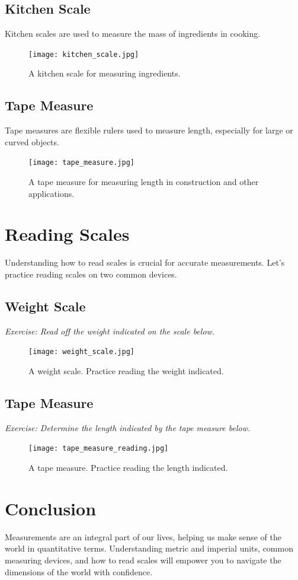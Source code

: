 \documentclass{article}
\begin{document}
\subsection*{Kitchen Scale}
Kitchen scales are used to measure the mass of ingredients in cooking.

\begin{figure}[h]
    \centering
    \texttt{[image: kitchen\_scale.jpg]}
    \caption{A kitchen scale for measuring ingredients.}
\end{figure}

\subsection*{Tape Measure}
Tape measures are flexible rulers used to measure length, especially for large or curved objects.

\begin{figure}[h]
    \centering
    \texttt{[image: tape\_measure.jpg]}
    \caption{A tape measure for measuring length in construction and other applications.}
\end{figure}

\section*{Reading Scales}
Understanding how to read scales is crucial for accurate measurements. Let's practice reading scales on two common devices.

\subsection*{Weight Scale}
\textit{Exercise: Read off the weight indicated on the scale below.}

\begin{figure}[h]
    \centering
    \texttt{[image: weight\_scale.jpg]}
    \caption{A weight scale. Practice reading the weight indicated.}
\end{figure}

\subsection*{Tape Measure}
\textit{Exercise: Determine the length indicated by the tape measure below.}

\begin{figure}[h]
    \centering
    \texttt{[image: tape\_measure\_reading.jpg]}
    \caption{A tape measure. Practice reading the length indicated.}
\end{figure}

\section*{Conclusion}
Measurements are an integral part of our lives, helping us make sense of the world in quantitative terms. Understanding metric and imperial units, common measuring devices, and how to read scales will empower you to navigate the dimensions of the world with confidence.
\end{document}
